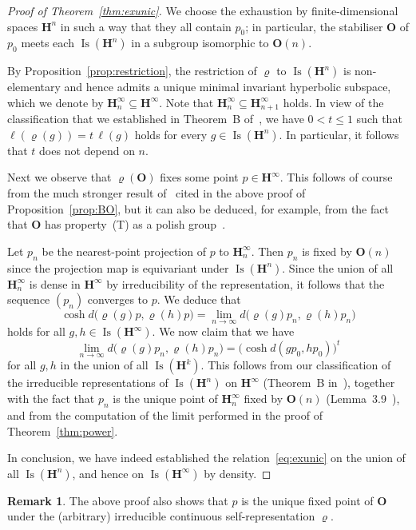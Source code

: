 \documentclass[11pt]{article}
\theoremstyle{definition}
\newtheorem{rema}[theo]{Remark}
\numberwithin{equation}{section}
\numberwithin{figure}{section}
\numberwithin{table}{section}
\newcommand{\HH}{\mathbf{H}}
\newcommand{\HHI}{\mathbf{H}^{\infty}}
\newcommand{\OO}{{\mathbf O}}
\newcommand{\Isomi}{{\Isom}(\HHI)}
\DeclareMathOperator{\Isom}{Is}
\newcommand{\se}{\subseteq}
\newcommand{\ro}{\varrho}
\newcommand*{\MK}{\mkern 2mu}
\begin{document}
\begin{proof}[Proof of Theorem~\ref{thm:exunic}]
We choose the exhaustion by finite-dimensional spaces $\HH^n$ in such a way that they all contain $p_0$; in particular, the stabiliser $\OO$ of $p_0$ meets each $\Isom(\HH^n)$ in a subgroup isomorphic to $\OO(n)$.

By Proposition~\ref{prop:restriction}, the restriction of $\ro$ to $\Isom(\HH^n)$ is non-elementary and hence admits a unique minimal invariant hyperbolic subspace, which we denote by $\HHI_n\se \HHI$. Note that $\HHI_n\se \HHI_{n+1}$ holds. In view of the classification that we established in Theorem~B of~\cite{Monod-Py}, we have $0<t\leq 1$ such that $\ell(\ro(g)) = t \, \ell(g)$ holds for every $g\in \Isom(\HH^n)$. In particular, it follows that $t$ does not depend on $n$.

Next we observe that $\ro(\OO)$ fixes some point $p\in\HHI$. This follows of course from the much stronger result of~\cite{Ricard-Rosendal} cited in the above proof of Proposition~\ref{prop:BO}, but it can also be deduced, for example, from the fact that $\OO$ has property~(T) as a polish group~\cite[Rem.~3$\MK$(i)]{Bekka03}.

Let $p_n$ be the nearest-point projection of $p$ to $\HHI_n$. Then $p_n$ is fixed by $\OO(n)$ since the projection map is equivariant under $\Isom(\HH^n)$. Since the union of all $\HHI_n$ is dense in $\HHI$ by irreducibility of the representation, it follows that the sequence $(p_n)$ converges to $p$. We deduce that
\[
\cosh d\big(\ro(g) p, \ro(h) p\big) = \lim_{n\to\infty} d\big(\ro(g) p_n, \ro(h) p_n\big)
\]
holds for all $g,h\in\Isomi$. We now claim that we have
\[
\lim_{n\to\infty} d\big(\ro(g) p_n, \ro(h) p_n\big) = \big(\cosh d(g p_0, h p_0)\big)^t
\]
for all $g,h$ in the union of all $\Isom(\HH^k)$. This follows from our classification of the irreducible representations of $\Isom(\HH^n)$ on $\HHI$ (Theorem~B in~\cite{Monod-Py}), together with the fact that $p_n$ is the unique point of $\HHI_n$ fixed by $\OO(n)$ (Lemma~3.9~\cite{Monod-Py}), and from the computation of the limit performed in the proof of Theorem~\ref{thm:power}.

In conclusion, we have indeed established the relation~\eqref{eq:exunic} on the union of all $\Isom(\HH^n)$, and hence on $\Isomi$ by density.
\end{proof}

\begin{rema}\label{rem:unique:O}
The above proof also shows that $p$ is the unique fixed point of $\OO$ under the (arbitrary) irreducible continuous self-representation $\ro$.
\end{rema}
\end{document}
